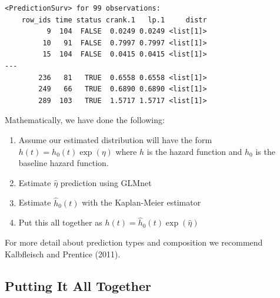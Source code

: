 \begin{Shaded}
\begin{Highlighting}[]
\OtherTok{=} \NormalTok{(}\NormalTok{(}
  \NormalTok{,}
   \NormalTok{,}
   
\NormalTok{))}

\SpecialCharTok{$}\SpecialCharTok{$}\SpecialCharTok{$}\SpecialCharTok{$}
\end{Highlighting}
\end{Shaded}

\begin{verbatim}
<PredictionSurv> for 99 observations:
    row_ids time status crank.1   lp.1     distr
          9  104  FALSE  0.0249 0.0249 <list[1]>
         10   91  FALSE  0.7997 0.7997 <list[1]>
         15  104  FALSE  0.0415 0.0415 <list[1]>
---                                             
        236   81   TRUE  0.6558 0.6558 <list[1]>
        249   66   TRUE  0.6890 0.6890 <list[1]>
        289  103   TRUE  1.5717 1.5717 <list[1]>
\end{verbatim}

Mathematically, we have done the following:

\begin{enumerate}
\def\labelenumi{\arabic{enumi}.}
\tightlist
\item
  Assume our estimated distribution will have the form
  \(h(t) = h_0(t)\exp(\eta)\) where \(h\) is the hazard function and
  \(h_0\) is the baseline hazard function.
\item
  Estimate \(\hat{\eta}\) prediction using GLMnet
\item
  Estimate \(\hat{h}_0(t)\) with the Kaplan-Meier estimator
\item
  Put this all together as \(h(t) = \hat{h}_0(t)\exp(\hat{\eta})\)
\end{enumerate}

For more detail about prediction types and composition we recommend
Kalbfleisch and Prentice (2011).

\hypertarget{sec-survival-all}{%
\subsection{Putting It All Together}\label{sec-survival-all}}

